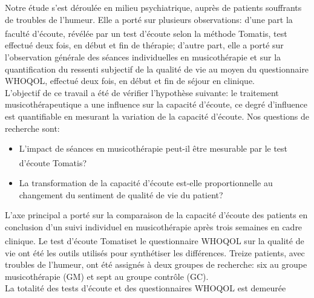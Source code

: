 Notre étude s'est déroulée  en milieu psychiatrique, 
auprès de patients souffrants de troubles de l'humeur.
Elle a porté sur plusieurs observations: d'une part la faculté d'écoute, révélée par un test 
d'écoute selon la méthode Tomatis\textsuperscript \textregistered, test effectué deux fois, en début et 
fin de thérapie; d'autre part, elle a porté sur l'observation générale des séances individuelles en 
musicothérapie et  sur la quantification du ressenti subjectif de la qualité de vie au moyen du 
questionnaire WHOQOL, effectué deux fois, en début et fin de séjour en clinique.
 \\
L'objectif de ce travail a été de vérifier l'hypothèse suivante: 
le traitement musicothérapeutique a une influence sur la capacité d'écoute,  ce degré d'influence est 
quantifiable en mesurant la variation de la capacité d'écoute.
Nos questions de recherche sont: 
\begin{itemize}
	\item L'impact de séances en musicothérapie  peut-il être mesurable par le test 
	d'écoute Tomatis\textsuperscript \textregistered?
	\item La transformation de la capacité d'écoute est-elle  proportionnelle au changement 
	du sentiment de qualité de vie du patient?
\end{itemize}
 L'axe principal a porté sur la comparaison de la capacité d'écoute des patients en conclusion d'un suivi 
 individuel en musicothérapie après trois semaines en cadre clinique.
 Le test d'écoute Tomatis\textsuperscript \textregistered  et le questionnaire WHOQOL sur la qualité de 
 vie 
 ont été les outils 
 utilisés 
 pour synthétiser les différences. 
 Treize  patients, avec troubles de l'humeur, ont été assignés à deux groupes de recherche: 
 six au groupe
 musicothérapie (GM) et sept au groupe contrôle (GC).
   \\
 La totalité des tests d'écoute et des questionnaires WHOQOL est  demeurée 

